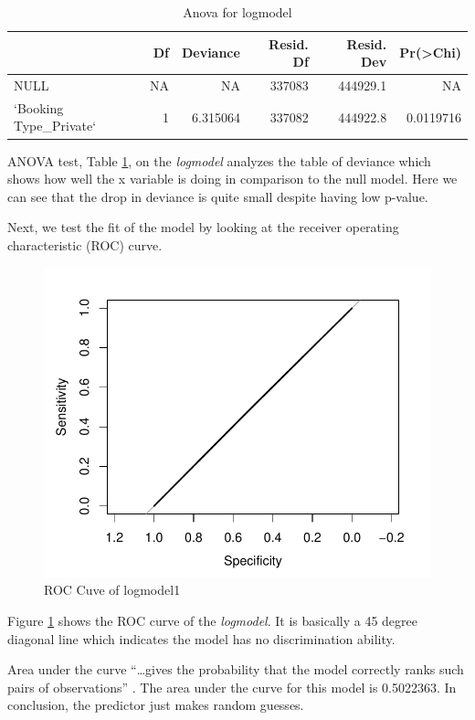 \documentclass[11pt,a4paper,]{article}
\begin{document}
\begin{table}

\caption{\label{tab:anova}Anova for logmodel}
\centering
\begin{tabular}[t]{lrrrrr}
\toprule
  & Df & Deviance & Resid. Df & Resid. Dev & Pr(>Chi)\\
\midrule
NULL & NA & NA & 337083 & 444929.1 & NA\\
`Booking Type\_Private` & 1 & 6.315064 & 337082 & 444922.8 & 0.0119716\\
\bottomrule
\end{tabular}
\end{table}

ANOVA test, Table \ref{tab:anova}, on the \emph{logmodel} analyzes the table of deviance which shows how well the x variable is doing in comparison to the null model. Here we can see that the drop in deviance is quite small despite having low p-value.

Next, we test the fit of the model by looking at the receiver operating characteristic (ROC) curve.

\begin{figure}
\centering
\includegraphics{Assignment4_files/figure-latex/roc-1.pdf}
\caption{\label{fig:roc}ROC Cuve of logmodel1}
\end{figure}

Figure \ref{fig:roc} shows the ROC curve of the \emph{logmodel}. It is basically a 45 degree diagonal line which indicates the model has no discrimination ability.

Area under the curve ``\ldots gives the probability that the model correctly ranks such pairs of observations'' \textcite{bartlett_2014}. The area under the curve for this model is 0.5022363. In conclusion, the predictor just makes random guesses.
\end{document}
